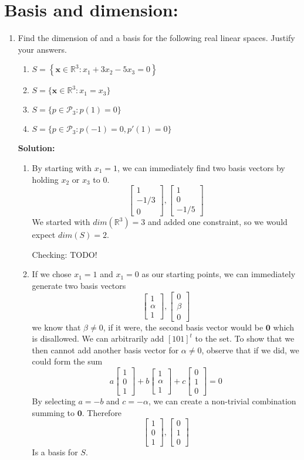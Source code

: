 \documentclass[]{article}
\newcommand{\R}{\mathbb{R}}				%
\newcommand{\bbm}{\begin{bmatrix}}		%
\newcommand{\ebm}{\end{bmatrix}}		%
\newcommand{\x}{\bm{x}}					%
\newcommand{\solution}{\vskip 0.5cm \textbf{\large Solution:} \\}
\begin{document}
    \section*{Basis and dimension:}
    \begin{enumerate}[resume]

	\item Find the dimension of and a basis for the following real linear spaces. Justify your answers.
	  \begin{enumerate}
	  \item $S=\left\{\x\in\R^3 : x_1+3x_2-5x_3=0 \right\}$
	  \item $S=\{\x\in\R^3 : x_1=x_3 \}$
	  \item $S = \{p\in\mathcal{P}_3: p(1)=0\}$
	  \item $S = \{p\in\mathcal{P}_3: p(-1)=0, p'(1)=0\}$
	  \end{enumerate}

	  \solution
	  \begin{enumerate}
	  \item By starting with $x_1 = 1$, we can immediately find two
        basis vectors by holding $x_2$ or $x_3$ to 0.
        \[
        \bbm 1 \\ -1/3 \\ 0 \ebm, \bbm 1 \\ 0 \\ -1/5 \ebm
        \]
        We started with $dim(\R^3) = 3$ and added one constraint, so we
        would expect $dim(S) = 2$.

        Checking: TODO!
        
	  \item If we chose $x_1 = 1$ and $x_1 = 0$ as our starting
        points, we can immediately generate two basis vectors
        \[
        \bbm 1\\\alpha\\1 \ebm, \bbm 0\\\beta\\0 \ebm
        \]
        we know that $\beta \neq 0$, if it were, the second basis
        vector would be $\bm{0}$ which is disallowed. We can
        arbitrarily add $[1 0 1]^t$ to the set. To show that we then
        cannot add another basis vector for $\alpha \neq 0$, observe
        that if we did, we could form the sum
        \[
        a \bbm 1\\ 0 \\1 \ebm + b \bbm 1\\ \alpha \\1 \ebm + c \bbm 0\\ 1 \\0 \ebm = 0
        \]
        By selecting $a = -b$ and $c = -\alpha$, we can create a
        non-trivial combination summing to $\bm{0}$. Therefore
        \[
        \bbm 1\\ 0 \\1 \ebm, \bbm 0\\ 1 \\0 \ebm
        \]
        Is a basis for $S$.



\end{enumerate}
\end{enumerate}
\end{document}
